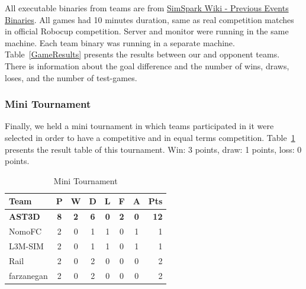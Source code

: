 All executable binaries from teams are from \href{http://simspark.sourceforge.net/binaries/RoboCup2011/}{SimSpark Wiki - Previous Events Binaries}. All games had 10 minutes duration, same as real competition matches in official Robocup competition. Server and monitor were running in the same machine\footnotemark. Each team binary was running in a separate machine\footnotemark . Table~\ref{GameResults} presents the results between our and opponent teams. There is information about the goal difference and the number of wins, draws, loses, and the number of test-games.


\subsubsection*{Mini Tournament}

Finally, we held a mini tournament in which teams participated in it were selected in order to have a competitive and in equal terms competition. Table~\ref{EasyTournament} presents the result table of this tournament. Win: 3 points, draw: 1 points, loss: 0 points.

\begin{table}[t!]
\begin{center}
\begin{tabular}{l*{6}{c}r}
Team              	& P & W & D & L & F  & A & Pts \\ \hline
\textbf{AST3D} 		& \textbf{8} & \textbf{2} & \textbf{6} & \textbf{0} & \textbf{ 2} & \textbf{0} &  \textbf{12}  \\
NomoFC            	& 2 & 0 & 1 & 1 &  0 & 1 &  1  \\
L3M-SIM     		& 2 & 0 & 1 & 1 &  0 & 1 &  1  \\
Rail     		    & 2 & 0 & 2 & 0 &  0 & 0 &  2  \\
farzanegan     		& 2 & 0 & 2 & 0 &  0 & 0 &  2  \\
\end{tabular}
\end{center}
\label{EasyTournament}
\caption{Mini Tournament}
\end{table}






